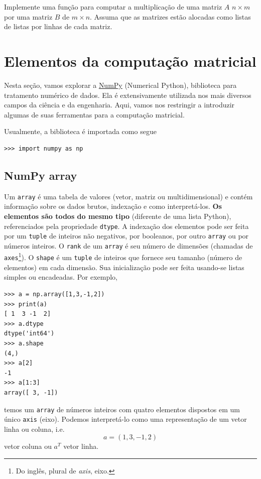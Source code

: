 \documentclass[12pt]{article}
\begin{document}
\begin{exr}
  Implemente uma função para computar a multiplicação de uma matriz $A$ $n\times m$ por uma matriz $B$ de $m\times n$. Assuma que as matrizes estão alocadas como listas de listas por linhas de cada matriz.
\end{exr}

\section{Elementos da computação matricial}\label{sec_mat}

Nesta seção, vamos explorar a \href{https://numpy.org/}{NumPy} (Numerical Python), biblioteca para tratamento numérico de dados. Ela é extensivamente utilizada nos mais diversos campos da ciência e da engenharia. Aqui, vamos nos restringir a introduzir algumas de suas ferramentas para a computação matricial.

Usualmente, a biblioteca é importada como segue

\begin{lstlisting}
>>> import numpy as np
\end{lstlisting}

\subsection{NumPy array}

Um \lstinline+array+ é uma tabela de valores (vetor, matriz ou multidimensional) e contém informação sobre os dados brutos, indexação e como interpretá-los. {\bf Os elementos são todos do mesmo tipo} (diferente de uma lista Python), referenciados pela propriedade \lstinline+dtype+. A indexação dos elementos pode ser feita por um \lstinline+tuple+ de inteiros não negativos, por booleanos, por outro \lstinline+array+ ou por números inteiros. O \lstinline+rank+ de um \lstinline+array+ é seu número de dimensões (chamadas de \lstinline+axes+\footnote{Do inglês, plural de {\it axis}, eixo.}). O \lstinline+shape+ é um \lstinline+tuple+ de inteiros que fornece seu tamanho (número de elementos) em cada dimensão. Sua inicialização pode ser feita usando-se listas simples ou encadeadas. Por exemplo,

\begin{lstlisting}
>>> a = np.array([1,3,-1,2])
>>> print(a)
[ 1  3 -1  2]
>>> a.dtype
dtype('int64')
>>> a.shape
(4,)
>>> a[2]
-1
>>> a[1:3]
array([ 3, -1])
\end{lstlisting}

temos um \lstinline+array+ de números inteiros com quatro elementos dispostos em um único \lstinline+axis+ (eixo). Podemos interpretá-lo como uma representação de um vetor linha ou coluna, i.e.
\begin{equation}
  a = (1, 3, -1, 2)
\end{equation}
vetor coluna ou $a^T$ vetor linha.
\end{document}
